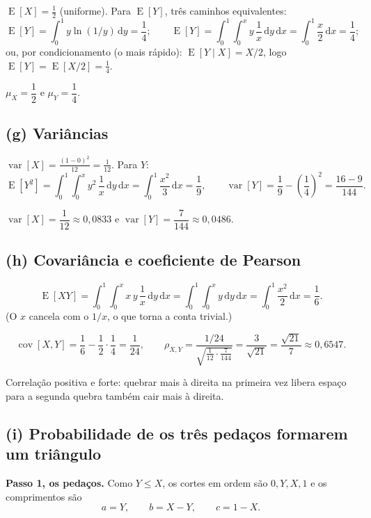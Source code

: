 \documentclass[11pt,a4paper]{article}
\newcommand{\dd}{\,\mathrm{d}}
\DeclareMathOperator{\E}{E}
\DeclareMathOperator{\var}{var}
\DeclareMathOperator{\cov}{cov}
\begin{document}
$\E[X]=\frac12$ (uniforme). Para $\E[Y]$, três caminhos equivalentes:
\[
\E[Y]=\int_0^1 y\ln(1/y)\dd y=\frac14;
\qquad
\E[Y]=\int_0^1\!\!\int_0^x y\,\frac1x \dd y\dd x=\int_0^1\frac{x}{2}\dd x=\frac14;
\]
ou, por condicionamento (o mais rápido): $\E[Y\mid X]=X/2$, logo
$\E[Y]=\E[X/2]=\frac14$.

\begin{resp}
$\mu_X=\dfrac12$ \qquad e \qquad $\mu_Y=\dfrac14$.
\end{resp}

\subsection*{(g) Variâncias}

$\var[X]=\frac{(1-0)^2}{12}=\frac1{12}$. Para $Y$:
\[
\E[Y^2]=\int_0^1\!\!\int_0^x y^2\,\frac1x\dd y\dd x=\int_0^1\frac{x^2}{3}\dd x=\frac19,
\qquad
\var[Y]=\frac19-\left(\frac14\right)^2=\frac{16-9}{144}.
\]

\begin{resp}
$\var[X]=\dfrac1{12}\approx0{,}0833$ \qquad e \qquad
$\var[Y]=\dfrac{7}{144}\approx0{,}0486$.
\end{resp}

\subsection*{(h) Covariância e coeficiente de Pearson}

\[
\E[XY]=\int_0^1\!\!\int_0^x x\,y\,\frac1x\dd y\dd x
=\int_0^1\!\!\int_0^x y \dd y\dd x=\int_0^1\frac{x^2}{2}\dd x=\frac16 .
\]
(O $x$ cancela com o $1/x$, o que torna a conta trivial.)

\begin{resp}
\[
\cov[X,Y]=\frac16-\frac12\cdot\frac14=\frac{1}{24},
\qquad
\rho_{X,Y}=\frac{1/24}{\sqrt{\frac1{12}\cdot\frac{7}{144}}}
=\frac{3}{\sqrt{21}}=\frac{\sqrt{21}}{7}\approx0{,}6547 .
\]
\end{resp}

Correlação positiva e forte: quebrar mais à direita na primeira vez libera espaço
para a segunda quebra também cair mais à direita.

\subsection*{(i) Probabilidade de os três pedaços formarem um triângulo}

\textbf{Passo 1, os pedaços.} Como $Y\le X$, os cortes em ordem são $0,Y,X,1$ e os
comprimentos são
\[
a=Y,\qquad b=X-Y,\qquad c=1-X .
\]
\end{document}
